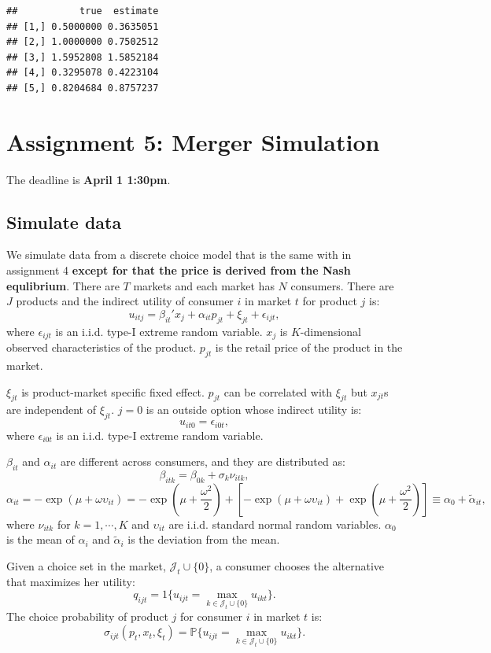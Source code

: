 \documentclass[]{book}
\begin{document}
\begin{verbatim}
##           true  estimate
## [1,] 0.5000000 0.3635051
## [2,] 1.0000000 0.7502512
## [3,] 1.5952808 1.5852184
## [4,] 0.3295078 0.4223104
## [5,] 0.8204684 0.8757237
\end{verbatim}

\chapter{Assignment 5: Merger Simulation}\label{assignment5}

The deadline is \textbf{April 1 1:30pm}.

\section{Simulate data}\label{simulate-data-4}

We simulate data from a discrete choice model that is the same with in
assignment 4 \textbf{except for that the price is derived from the Nash
equlibrium}. There are \(T\) markets and each market has \(N\)
consumers. There are \(J\) products and the indirect utility of consumer
\(i\) in market \(t\) for product \(j\) is: \[
u_{itj} = \beta_{it}' x_j + \alpha_{it} p_{jt} + \xi_{jt} + \epsilon_{ijt},
\] where \(\epsilon_{ijt}\) is an i.i.d. type-I extreme random variable.
\(x_j\) is \(K\)-dimensional observed characteristics of the product.
\(p_{jt}\) is the retail price of the product in the market.

\(\xi_{jt}\) is product-market specific fixed effect. \(p_{jt}\) can be
correlated with \(\xi_{jt}\) but \(x_{jt}\)s are independent of
\(\xi_{jt}\). \(j = 0\) is an outside option whose indirect utility is:
\[
u_{it0} = \epsilon_{i0t},
\] where \(\epsilon_{i0t}\) is an i.i.d. type-I extreme random variable.

\(\beta_{it}\) and \(\alpha_{it}\) are different across consumers, and
they are distributed as: \[
\beta_{itk} = \beta_{0k} + \sigma_k \nu_{itk},
\] \[
\alpha_{it} = - \exp(\mu + \omega \upsilon_{it}) = - \exp(\mu + \frac{\omega^2}{2}) + [- \exp(\mu + \omega \upsilon_{it}) + \exp(\mu + \frac{\omega^2}{2})] \equiv \alpha_0 + \tilde{\alpha}_{it},
\] where \(\nu_{itk}\) for \(k = 1, \cdots, K\) and \(\upsilon_{it}\)
are i.i.d. standard normal random variables. \(\alpha_0\) is the mean of
\(\alpha_i\) and \(\tilde{\alpha}_i\) is the deviation from the mean.

Given a choice set in the market, \(\mathcal{J}_t \cup \{0\}\), a
consumer chooses the alternative that maximizes her utility: \[
q_{ijt} = 1\{u_{ijt} = \max_{k \in \mathcal{J}_t \cup \{0\}} u_{ikt}\}.
\] The choice probability of product \(j\) for consumer \(i\) in market
\(t\) is: \[
\sigma_{ijt}(p_t, x_t, \xi_t) = \mathbb{P}\{u_{ijt} = \max_{k \in \mathcal{J}_t \cup \{0\}} u_{ikt}\}.
\]
\end{document}
